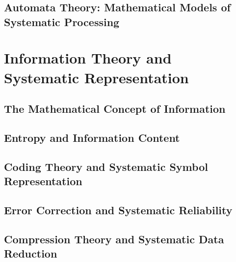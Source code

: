 \documentclass[12pt, oneside, openany]{book}
\begin{document}
\section{Automata Theory: Mathematical Models of Systematic Processing}


\chapter{Information Theory and Systematic Representation}

\section{The Mathematical Concept of Information}

\section{Entropy and Information Content}

\section{Coding Theory and Systematic Symbol Representation}

\section{Error Correction and Systematic Reliability}

\section{Compression Theory and Systematic Data Reduction}
\end{document}
